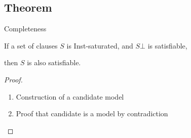 \documentclass[%
handout,
]{beamer}
\begin{document}
\subsection{Theorem}
\begin{frame}{Completeness}

    \vspace{1.4em}

    \begin{theorem}
    If a set of clauses $S$ is Inst-saturated,
    and $S\bot$ is satisfiable,

    then $S$ is also satisfiable.
    \end{theorem}
    \vspace{1.4em}

    \begin{proof}
        \begin{enumerate}
            \item Construction of a candidate model
            \item Proof that candidate is a model by contradiction
        \end{enumerate}
        \end{proof}
\end{frame}
\end{document}

